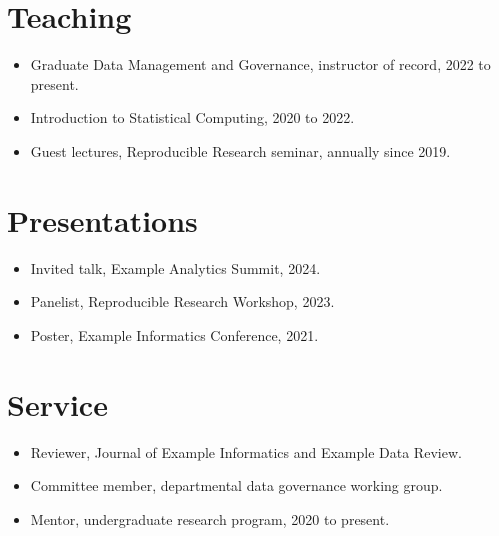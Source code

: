 \documentclass[letterpaper,12pt]{article}
\begin{document}
\section{Teaching}
\begin{itemize}[leftmargin=1.5em,itemsep=3pt]
\item Graduate Data Management and Governance, instructor of record, 2022 to present.
\item Introduction to Statistical Computing, 2020 to 2022.
\item Guest lectures, Reproducible Research seminar, annually since 2019.
\end{itemize}

\section{Presentations}
\begin{itemize}[leftmargin=1.5em,itemsep=3pt]
\item Invited talk, Example Analytics Summit, 2024.
\item Panelist, Reproducible Research Workshop, 2023.
\item Poster, Example Informatics Conference, 2021.
\end{itemize}

\section{Service}
\begin{itemize}[leftmargin=1.5em,itemsep=3pt]
\item Reviewer, Journal of Example Informatics and Example Data Review.
\item Committee member, departmental data governance working group.
\item Mentor, undergraduate research program, 2020 to present.
\end{itemize}
\end{document}
